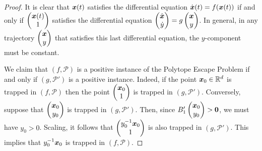 \begin{proof}
It is clear that $\boldsymbol{x}(t)$ satisfies the differential equation
$\dot{\boldsymbol{x}}(t)=f(\boldsymbol{x}(t))$ if and only if
$\begin{pmatrix}
\boldsymbol{x}(t)\\1 \end{pmatrix}$ satisfies
the differential equation
$\begin{pmatrix}\dot{\boldsymbol{x}}\\
\dot{y}
\end{pmatrix} = g\begin{pmatrix}\boldsymbol{x}\\y
\end{pmatrix}$.  In general,
in any trajectory $\begin{pmatrix}\boldsymbol{x}\\y
\end{pmatrix}$ that satisfies this last differential equation, the
$y$-component must be constant.

We claim that $(f,\mathcal{P})$ is a positive instance
of the Polytope Escape Problem if and
only if $(g,\mathcal{P}')$ is a positive instance.
Indeed, if the point
$\boldsymbol{x}_0 \in \mathbb{R}^d$ is trapped
in $(f,\mathcal{P})$
then the point $\begin{pmatrix}\boldsymbol{x}_0\\1
\end{pmatrix}$ is trapped in $(g,\mathcal{P}')$.
Conversely, suppose that $\begin{pmatrix}\boldsymbol{x}_0\\y_0
\end{pmatrix}$ is trapped in  $(g,\mathcal{P}')$.  Then,
since $B_{1}'\begin{pmatrix}\boldsymbol{x}_0\\y_0
\end{pmatrix}
> \boldsymbol{0}$,
we must have $y_0>0$.  Scaling, it follows that
$\begin{pmatrix} y_0^{-1}\boldsymbol{x}_0\\1
\end{pmatrix}$ is also trapped in $(g,\mathcal{P}')$.  This implies
that $y_0^{-1}\boldsymbol{x}_0$ is trapped in $(f,\mathcal{P})$.
%
\end{proof}

